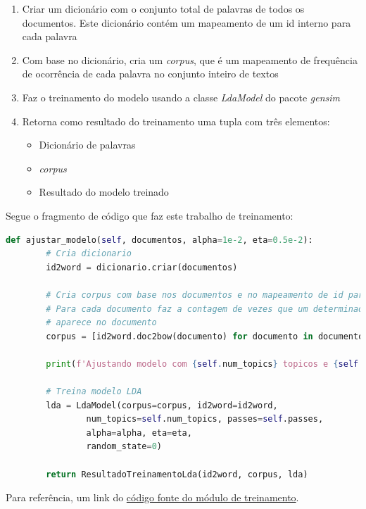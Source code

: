 \begin{enumerate}
    \item Criar um dicionário com o conjunto total de palavras de todos os documentos. Este dicionário contém um mapeamento de um id interno para cada palavra
    \item Com base no dicionário, cria um \textit{corpus}, que é um mapeamento de frequência de ocorrência de cada palavra no conjunto inteiro de textos
    \item Faz o treinamento do modelo usando a classe \textit{LdaModel} do pacote \textit{gensim}
    \item Retorna como resultado do treinamento uma tupla com três elementos:
    \begin{itemize}
        \item Dicionário de palavras
        \item \textit{corpus}
        \item Resultado do modelo treinado
    \end{itemize}
\end{enumerate}

Segue o fragmento de código que faz este trabalho de treinamento:
\vspace{3mm} %

\begin{lstlisting}[language=Python, style=mystyle, frame=lines, caption=Código fonte: Treinamento de modelo usando LDA]
    def ajustar_modelo(self, documentos, alpha=1e-2, eta=0.5e-2):
        # Cria dicionario
        id2word = dicionario.criar(documentos)

        # Cria corpus com base nos documentos e no mapeamento de id para palavra
        # Para cada documento faz a contagem de vezes que um determinado topico
        # aparece no documento
        corpus = [id2word.doc2bow(documento) for documento in documentos]

        print(f'Ajustando modelo com {self.num_topics} topicos e {self.passes} passes')

        # Treina modelo LDA        
        lda = LdaModel(corpus=corpus, id2word=id2word, 
                num_topics=self.num_topics, passes=self.passes, 
                alpha=alpha, eta=eta,
                random_state=0)

        return ResultadoTreinamentoLda(id2word, corpus, lda)
\end{lstlisting}

Para referência, um link do \href{https://github.com/heldergr/tcc-pucmg-2/blob/main/src/python/notebooks/treinamento/treinamento_lda.py}{código fonte do módulo de treinamento}.

